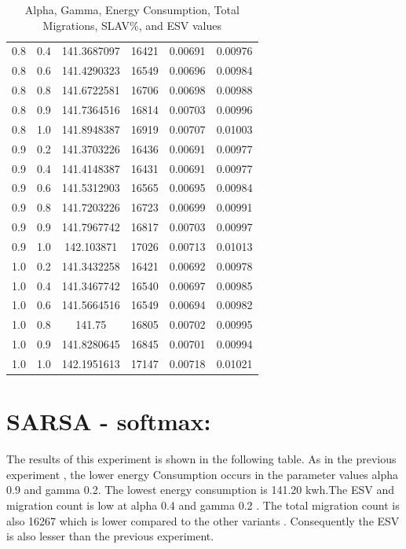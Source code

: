\documentclass[a4paper,12pt]{Classes/RoboticsLaTeX}
\begin{document}
\begin{table}[H]
\begin{tabular}{|c|c|c|c|c|c|}
        0.8 & 0.4 & 141.3687097 & 16421 & 0.00691 & 0.00976 \\ 
        0.8 & 0.6 & 141.4290323 & 16549 & 0.00696 & 0.00984 \\ 
        0.8 & 0.8 & 141.6722581 & 16706 & 0.00698 & 0.00988 \\ 
        0.8 & 0.9 & 141.7364516 & 16814 & 0.00703 & 0.00996 \\ 
        0.8 & 1.0 & 141.8948387 & 16919 & 0.00707 & 0.01003 \\ 
        0.9 & 0.2 & 141.3703226 & 16436 & 0.00691 & 0.00977 \\ 
        0.9 & 0.4 & 141.4148387 & 16431 & 0.00691 & 0.00977 \\ 
        0.9 & 0.6 & 141.5312903 & 16565 & 0.00695 & 0.00984 \\ 
        0.9 & 0.8 & 141.7203226 & 16723 & 0.00699 & 0.00991 \\ 
        0.9 & 0.9 & 141.7967742 & 16817 & 0.00703 & 0.00997 \\ 
        0.9 & 1.0 & 142.103871 & 17026 & 0.00713 & 0.01013 \\ 
        1.0 & 0.2 & 141.3432258 & 16421 & 0.00692 & 0.00978 \\ 
        1.0 & 0.4 & 141.3467742 & 16540 & 0.00697 & 0.00985 \\ 
        1.0 & 0.6 & 141.5664516 & 16549 & 0.00694 & 0.00982 \\ 
        1.0 & 0.8 & 141.75 & 16805 & 0.00702 & 0.00995 \\ 
        1.0 & 0.9 & 141.8280645 & 16845 & 0.00701 & 0.00994 \\ 
        1.0 & 1.0 & 142.1951613 & 17147 & 0.00718 & 0.01021 \\ 
        \hline
        \end{tabular}
        \caption{Alpha, Gamma, Energy Consumption, Total Migrations, SLAV\%, and ESV values}
        \end{table}


        \section{SARSA - softmax:}

        The results of this experiment is shown in the following table. As in the previous experiment , the lower energy Consumption occurs in the parameter values alpha 0.9 and gamma 0.2.  The lowest energy consumption is 141.20 kwh.The ESV and migration count is low at alpha 0.4 and gamma 0.2 . The total migration count is also 16267 which is lower compared to  the other  variants . Consequently the ESV is also lesser than the previous experiment.
        
\end{document}
